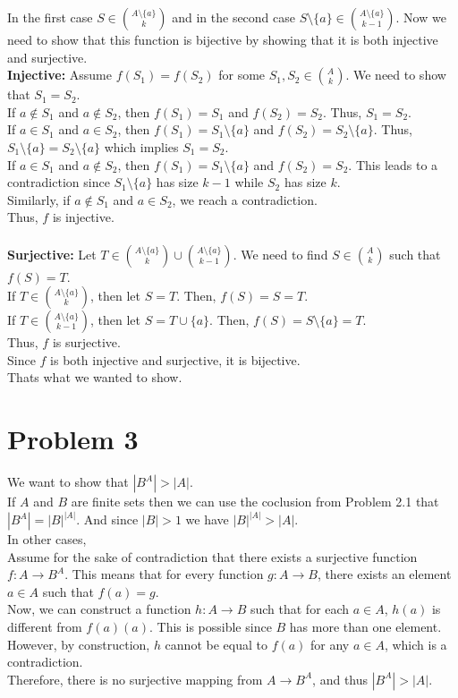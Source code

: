 \documentclass{article}
\begin{document}
In the first case \(S \in \binom{A \setminus \{a\}}{k}\) and in the second case \(S \setminus \{a\} \in \binom{A \setminus \{a\}}{k-1}\). Now we need to show that this function
is bijective by showing that it is both injective and surjective.\\
\textbf{Injective:} Assume \( f(S_1) = f(S_2) \) for some \( S_1, S_2 \in \binom{A}{k} \). We need to show that \( S_1 = S_2 \).\\
If \( a \notin S_1 \) and \( a \notin S_2 \), then \( f(S_1) = S_1 \) and \( f(S_2) = S_2 \). Thus, \( S_1 = S_2 \).\\
If \( a \in S_1 \) and \( a \in S_2 \), then \( f(S_1) = S_1 \setminus \{a\} \) and \( f(S_2) = S_2 \setminus \{a\} \). Thus, \( S_1 \setminus \{a\} = S_2 \setminus \{a\} \) which implies \( S_1 = S_2 \).\\
If \( a \in S_1 \) and \( a \notin S_2 \), then \( f(S_1) = S_1 \setminus \{a\} \) and \( f(S_2) = S_2 \). This leads to a contradiction since \( S_1 \setminus \{a\} \) has size \( k-1 \) while \( S_2 \) has size \( k \).\\
Similarly, if \( a \notin S_1 \) and \( a \in S_2 \), we reach a contradiction.\\
Thus, \( f \) is injective.\\
\\
\textbf{Surjective:} Let \( T \in \binom{A \setminus \{a\}}{k} \cup \binom{A \setminus \{a\}}{k-1} \). We need to find \( S \in \binom{A}{k} \) such that \( f(S) = T \).\\
If \( T \in \binom{A \setminus \{a\}}{k} \), then let \( S = T \). Then, \( f(S) = S = T \).\\
If \( T \in \binom{A \setminus \{a\}}{k-1} \), then let \( S = T \cup \{a\} \). Then, \( f(S) = S \setminus \{a\} = T \).\\
Thus, \( f \) is surjective.\\
Since \( f \) is both injective and surjective, it is bijective.\\
Thats what we wanted to show.

\section*{Problem 3}
We want to show that \(|B^A| > |A|\).\\
If \(A\) and \(B\) are finite sets then we can use the coclusion from Problem 2.1 that \(|B^A| = |B|^{|A|}\). And since \(|B| > 1\) we have \(|B|^{|A|} > |A|\).\\
In other cases, \\
Assume for the sake of contradiction that there exists a surjective function \( f: A \to B^A \). This means that for every function \( g: A \to B \), there exists an element \( a \in A \) such that \( f(a) = g \).\\
Now, we can construct a function \( h: A \to B \) such that for each \( a \in A \), \( h(a) \) is different from \( f(a)(a) \). This is possible since \( B \) has more than one element.\\
However, by construction, \( h \) cannot be equal to \( f(a) \) for any \( a \in A \), which is a contradiction.\\
Therefore, there is no surjective mapping from \( A \to B^A \), and thus \(|B^A| > |A|\).
\end{document}
